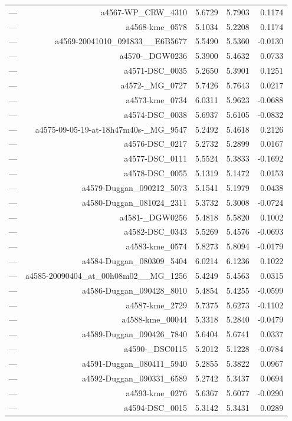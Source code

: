 \begin{table}[htbp]
\begin{tabular}{lrrrr}
— & a4567-WP_CRW_4310 & 5.6729 & 5.7903 & 0.1174 \\
— & a4568-kme_0578 & 5.1034 & 5.2208 & 0.1174 \\
— & a4569-20041010_091833__E6B5677 & 5.5490 & 5.5360 & -0.0130 \\
— & a4570-_DGW0236 & 5.3900 & 5.4632 & 0.0733 \\
— & a4571-DSC_0035 & 5.2650 & 5.3901 & 0.1251 \\
— & a4572-_MG_0727 & 5.7426 & 5.7643 & 0.0217 \\
— & a4573-kme_0734 & 6.0311 & 5.9623 & -0.0688 \\
— & a4574-DSC_0038 & 5.6937 & 5.6105 & -0.0832 \\
— & a4575-09-05-19-at-18h47m40s-_MG_9547 & 5.2492 & 5.4618 & 0.2126 \\
— & a4576-DSC_0217 & 5.2732 & 5.2899 & 0.0167 \\
— & a4577-DSC_0111 & 5.5524 & 5.3833 & -0.1692 \\
— & a4578-DSC_0055 & 5.1319 & 5.1472 & 0.0153 \\
— & a4579-Duggan_090212_5073 & 5.1541 & 5.1979 & 0.0438 \\
— & a4580-Duggan_081024_2311 & 5.3732 & 5.3008 & -0.0724 \\
— & a4581-_DGW0256 & 5.4818 & 5.5820 & 0.1002 \\
— & a4582-DSC_0343 & 5.5269 & 5.4576 & -0.0693 \\
— & a4583-kme_0574 & 5.8273 & 5.8094 & -0.0179 \\
— & a4584-Duggan_080309_5404 & 6.0214 & 6.1236 & 0.1022 \\
— & a4585-20090404_at_00h08m02__MG_1256 & 5.4249 & 5.4563 & 0.0315 \\
— & a4586-Duggan_090428_8010 & 5.4854 & 5.4255 & -0.0599 \\
— & a4587-kme_2729 & 5.7375 & 5.6273 & -0.1102 \\
— & a4588-kme_00044 & 5.3318 & 5.2840 & -0.0479 \\
— & a4589-Duggan_090426_7840 & 5.6404 & 5.6741 & 0.0337 \\
— & a4590-_DSC0115 & 5.2012 & 5.1228 & -0.0784 \\
— & a4591-Duggan_080411_5940 & 5.2855 & 5.3822 & 0.0967 \\
— & a4592-Duggan_090331_6589 & 5.2742 & 5.3437 & 0.0694 \\
— & a4593-kme_0276 & 5.6367 & 5.6077 & -0.0290 \\
— & a4594-DSC_0015 & 5.3142 & 5.3431 & 0.0289 \\

\end{tabular}
\end{table}
